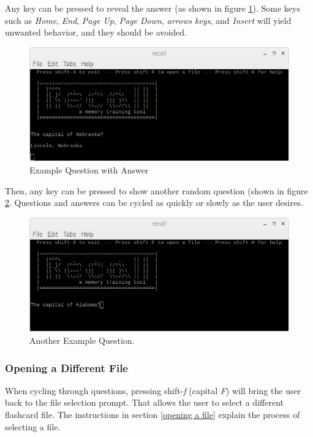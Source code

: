\documentclass[letterpaper]{article}
\begin{document}
Any key can be pressed to reveal the answer (as shown in figure \ref{fig:example_answer_1}). Some keys such as \textit{Home}, \textit{End}, \textit{Page Up}, \textit{Page Down}, \textit{arrows keys}, and \textit{Insert} will yield unwanted behavior, and they should be avoided.

\begin{figure}[H]
  \centering
  \includegraphics[width=14cm]{images/running/questian1_with_answer.png}
  \caption{Example Question with Answer}
  \label{fig:example_answer_1}
\end{figure}

Then, any key can be pressed to show another random question (shown in figure \ref{fig:example_questian_2}. Questions and answers can be cycled as quickly or slowly as the user desires.

\begin{figure}[H]
  \centering
  \includegraphics[width=14cm]{images/running/questian2.png}
  \caption{Another Example Question.}
  \label{fig:example_questian_2}
\end{figure}

\subsubsection{Opening a Different File}
When cycling through questions, pressing shift-\textit{f} (capital \textit{F}) will bring the user back to the file selection prompt. That allows the user to select a different flashcard file. The instructions in section \ref{opening a file} explain the process of selecting a file.
\end{document}
